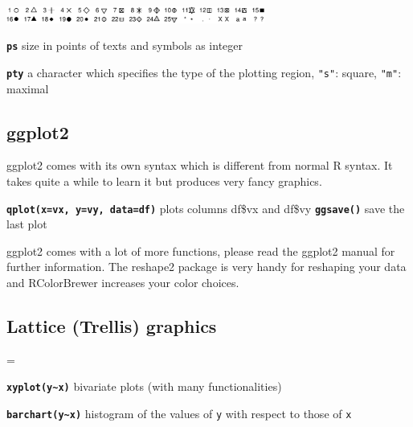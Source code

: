 \documentclass[8pt,landscape]{article}
\newcommand{\code}{\texttt}
\newcommand{\bcode}[1]{\texttt{\textbf{#1}}}
\begin{document}
\begin{multicols*}{3}
\samepage\includegraphics[width=8.5cm]{pch_symbol} 

\smallskip

\bcode{ps}   size in points of texts and symbols as integer

\bcode{pty}  a character which specifies the type of the plotting region, \code{"s"}: square, \code{"m"}: maximal






\bigskip

\subsection{ggplot2}

ggplot2 comes with its own syntax which is different from normal R syntax. It takes quite a while to learn it but produces very fancy graphics.

\bcode{qplot(x=vx, y=vy, data=df)} plots columns df\$vx and df\$vy
\bcode{ggsave()} save the last plot

\smallskip 

ggplot2 comes with a lot of more functions, please read the ggplot2 manual for further information. The reshape2 package is very handy for reshaping your data and RColorBrewer increases your color choices.

\bigskip

\subsection{Lattice (Trellis) graphics}
\everypar={\hangindent=9mm}

\bcode{xyplot(y\~{}x)}  bivariate plots (with many functionalities)

\bcode{barchart(y\~{}x)}  histogram of the values of \code{y} with
respect to those of \code{x}


\end{multicols*}
\end{document}
